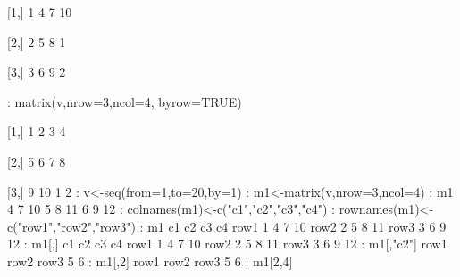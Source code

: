 \documentclass[10pt,a4paper]{article}
\begin{document}
{{     [1,]    1    4    7   10
\newline

     [2,]    2    5    8    1
\newline
    
     [3,]    3    6    9    2
\newline

: matrix(v,nrow=3,ncol=4, byrow=TRUE)
\newline
[,1] [,2] [,3] [,4]
\newline

[1,]    1    2    3    4
\newline

[2,]    5    6    7    8
\newline

[3,]    9   10    1    2
\newline
: v<-seq(from=1,to=20,by=1)
\newline
: m1<-matrix(v,nrow=3,ncol=4)
\newline
: m1
\newline
[,1] [,2] [,3] [,4]
    4    7   10
    5    8   11
    6    9   12
\newline
: colnames(m1)<-c("c1","c2","c3","c4")
\newline
: rownames(m1)<-c("row1","row2","row3")
\newline
: m1
\newline
c1 c2 c3 c4
\newline
row1  1  4  7 10
\newline
row2  2  5  8 11
\newline
row3  3  6  9 12
\newline
: m1[,]
\newline
c1 c2 c3 c4
\newline
row1  1  4  7 10
\newline
row2  2  5  8 11
\newline
row3  3  6  9 12
\newline
: m1[,"c2"]
\newline
row1 row2 row3 
    5    6 
\newline
: m1[,2]
\newline
row1 row2 row3 
    5    6 
\newline
: m1[2,4]
\newline
}}
\end{document}
